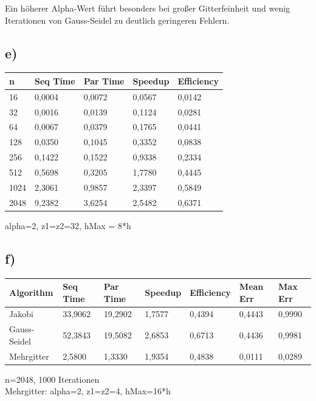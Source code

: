 \documentclass[paper = a4]{scrartcl}
\begin{document}
Ein höherer Alpha-Wert führt besonders bei großer Gitterfeinheit und wenig Iterationen von Gauss-Seidel zu deutlich geringeren Fehlern.

\subsection*{e)}
\begin{tabular}{l|l|l|l|l}
\hline
n    & Seq Time & Par Time & Speedup & Efficiency \\
\hline
16   & 0,0004   & 0,0072   & 0,0567  & 0,0142 \\
32   & 0,0016   & 0,0139   & 0,1124  & 0,0281 \\
64   & 0,0067   & 0,0379   & 0,1765  & 0,0441 \\
128  & 0,0350   & 0,1045   & 0,3352  & 0,0838 \\
256  & 0,1422   & 0,1522   & 0,9338  & 0,2334 \\
512  & 0,5698   & 0,3205   & 1,7780  & 0,4445 \\
1024 & 2,3061   & 0,9857   & 2,3397  & 0,5849 \\
2048 & 9,2382   & 3,6254   & 2,5482  & 0,6371 \\
\hline
\end{tabular}
alpha=2, z1=z2=32, hMax = 8*h

\subsection*{f)}
\begin{tabular}{l|l|l|l|l|l|l}
\hline
Algorithm    & Seq Time & Par Time & Speedup & Efficiency & Mean Err & Max Err \\
\hline
Jakobi       & 33,9062  & 19,2902  & 1,7577  & 0,4394     & 0,4443   & 0,9990 \\
Gauss-Seidel & 52,3843  & 19,5082  & 2,6853  & 0,6713     & 0,4436   & 0,9981 \\
Mehrgitter   & 2,5800   & 1,3330   & 1,9354  & 0,4838     & 0,0111   & 0,0289 \\
\hline
\end{tabular}
n=2048, 1000 Iterationen\\
Mehrgitter: alpha=2, z1=z2=4, hMax=16*h
\end{document}
